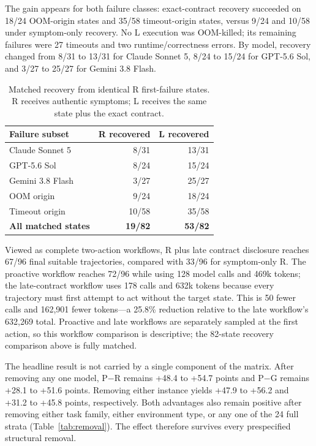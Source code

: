 \documentclass[sigconf,anonymous]{aamas}
\begin{document}
The gain appears for both failure classes: exact-contract recovery succeeded on
18/24 OOM-origin states and 35/58 timeout-origin states, versus 9/24 and 10/58
under symptom-only recovery. No L execution was OOM-killed; its remaining
failures were 27 timeouts and two runtime/correctness errors. By model, recovery
changed from 8/31 to 13/31 for Claude Sonnet 5, 8/24 to 15/24 for GPT-5.6 Sol,
and 3/27 to 25/27 for Gemini 3.8 Flash.

\begin{table}[t]
  \caption{Matched recovery from identical R first-failure states. R receives
  authentic symptoms; L receives the same state plus the exact contract.}
  \label{tab:late}
  \centering
  \small
  \begin{tabular}{lrr}\toprule
  Failure subset & R recovered & L recovered \\\midrule
  Claude Sonnet 5 & 8/31 & 13/31 \\
  GPT-5.6 Sol & 8/24 & 15/24 \\
  Gemini 3.8 Flash & 3/27 & 25/27 \\
  OOM origin & 9/24 & 18/24 \\
  Timeout origin & 10/58 & 35/58 \\
  \textbf{All matched states} & \textbf{19/82} & \textbf{53/82} \\\bottomrule
  \end{tabular}
\end{table}

Viewed as complete two-action workflows, R plus late contract disclosure reaches
67/96 final suitable trajectories, compared with 33/96 for symptom-only R. The
proactive workflow reaches 72/96 while using 128 model calls and 469k tokens;
the late-contract workflow uses 178 calls and 632k tokens because every trajectory
must first attempt to act without the target state. This is 50 fewer calls and
162,901 fewer tokens---a 25.8\% reduction relative to the late workflow's 632,269
total. Proactive and late workflows
are separately sampled at the first action, so this workflow comparison is
descriptive; the 82-state recovery comparison above is fully matched.

The headline result is not carried by a single component of the matrix. After
removing any one model, P$-$R remains +48.4 to +54.7 points and P$-$G remains
+28.1 to +51.6 points. Removing either instance yields +47.9 to +56.2 and +31.2
to +45.8 points, respectively. Both advantages also remain positive after
removing either task family, either environment type, or any one of the 24 full
strata (Table~\ref{tab:removal}). The effect therefore survives every
prespecified structural removal.
\end{document}
